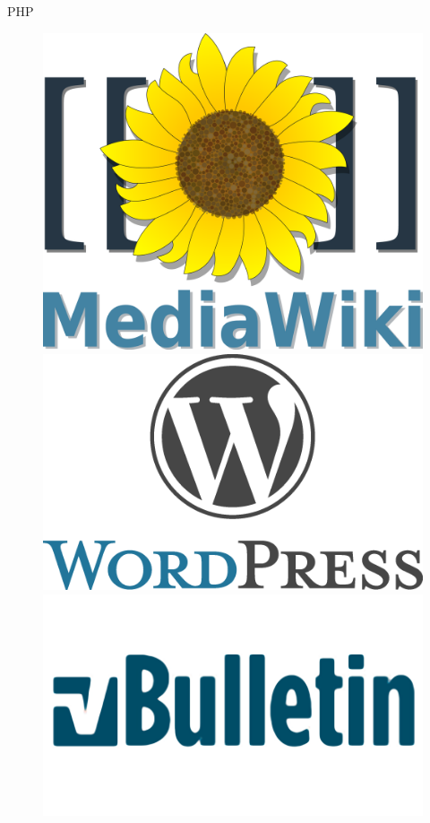 \begin{frame}[t]{PHP}
	\begin{figure}[!htb]
	    \centering
	    \begin{minipage}{.3\textwidth}
	        \centering
	        \includegraphics[width=0.9\linewidth]{images/media_wiki_logo}
	    \end{minipage}%
	    \begin{minipage}{0.3\textwidth}
	        \centering
	        \includegraphics[width=0.9\linewidth]{images/wordpress_logo}
	    \end{minipage}
	    \begin{minipage}{0.3\textwidth}
	        \centering
	        \includegraphics[width=0.9\linewidth]{images/vbulletin_logo}
	    \end{minipage}
	\end{figure}

\end{frame}

